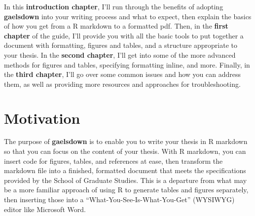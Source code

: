 \documentclass[12pt, oneside]{queensuthesis}
\numberwithin{equation}{chapter}       %
\begin{document}
In this \textbf{introduction chapter}, I'll run through the benefits of adopting \textbf{gaelsdown} into your writing process and what to expect, then explain the basics of how you get from a R markdown to a formatted pdf. Then, in the \textbf{first chapter} of the guide, I'll provide you with all the basic tools to put together a document with formatting, figures and tables, and a structure appropriate to your thesis. In the \textbf{second chapter}, I'll get into some of the more advanced methods for figures and tables, specifying formatting inline, and more. Finally, in the \textbf{third chapter}, I'll go over some common issues and how you can address them, as well as providing more resources and approaches for troubleshooting.

\hypertarget{motivation}{%
\section*{Motivation}\label{motivation}}

The purpose of \textbf{gaelsdown} is to enable you to write your thesis in R markdown so that you can focus on the content of your thesis. With R markdown, you can insert code for figures, tables, and references at ease, then transform the markdown file into a finished, formatted document that meets the specifications provided by the School of Graduate Studies. This is a departure from what may be a more familiar approach of using R to generate tables and figures separately, then inserting those into a ``What-You-See-Is-What-You-Get'' (WYSIWYG) editor like Microsoft Word.
\end{document}
